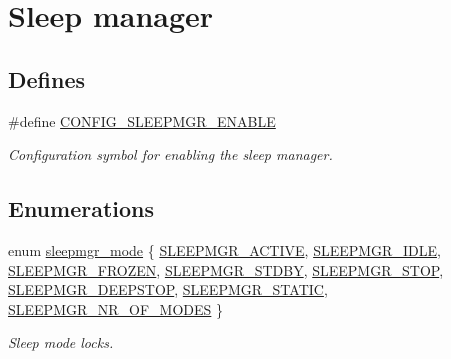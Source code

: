 \hypertarget{group__sleepmgr__group}{
\section{\-Sleep manager}
\label{group__sleepmgr__group}
}
\subsection*{\-Defines}
\begin{DoxyCompactItemize}
\item 
\#define \hyperlink{group__sleepmgr__group_gad8e649a9d53092c580960f2f9886ee98}{\-C\-O\-N\-F\-I\-G\-\_\-\-S\-L\-E\-E\-P\-M\-G\-R\-\_\-\-E\-N\-A\-B\-L\-E}
\begin{DoxyCompactList}\small\item\em \-Configuration symbol for enabling the sleep manager. \end{DoxyCompactList}\end{DoxyCompactItemize}
\subsection*{\-Enumerations}
\begin{DoxyCompactItemize}
\item 
enum \hyperlink{group__sleepmgr__group_gaa990bc3ea16fcad09009cdc70dbc38c6}{sleepmgr\-\_\-mode} \{ \*
\hyperlink{group__sleepmgr__group_ggaa990bc3ea16fcad09009cdc70dbc38c6a04a2ceb6fc138cae84e9334cfa90d89f}{\-S\-L\-E\-E\-P\-M\-G\-R\-\_\-\-A\-C\-T\-I\-V\-E}, 
\hyperlink{group__sleepmgr__group_ggaa990bc3ea16fcad09009cdc70dbc38c6ae4f3742b3532d5ebabef6f26fabf4487}{\-S\-L\-E\-E\-P\-M\-G\-R\-\_\-\-I\-D\-L\-E}, 
\hyperlink{group__sleepmgr__group_ggaa990bc3ea16fcad09009cdc70dbc38c6a07fe232646cccb4c2b9e0ba301866cb9}{\-S\-L\-E\-E\-P\-M\-G\-R\-\_\-\-F\-R\-O\-Z\-E\-N}, 
\hyperlink{group__sleepmgr__group_ggaa990bc3ea16fcad09009cdc70dbc38c6affb1e224bd127ccf5c7b54a54c3ba665}{\-S\-L\-E\-E\-P\-M\-G\-R\-\_\-\-S\-T\-D\-B\-Y}, 
\*
\hyperlink{group__sleepmgr__group_ggaa990bc3ea16fcad09009cdc70dbc38c6a84505afbeafb45b0c9e9b5fc1a1e3e5e}{\-S\-L\-E\-E\-P\-M\-G\-R\-\_\-\-S\-T\-O\-P}, 
\hyperlink{group__sleepmgr__group_ggaa990bc3ea16fcad09009cdc70dbc38c6a6ee894e3a9dc55e678d10a9cebff5dd1}{\-S\-L\-E\-E\-P\-M\-G\-R\-\_\-\-D\-E\-E\-P\-S\-T\-O\-P}, 
\hyperlink{group__sleepmgr__group_ggaa990bc3ea16fcad09009cdc70dbc38c6adbc00d523bb40feb59822bfbec8106c4}{\-S\-L\-E\-E\-P\-M\-G\-R\-\_\-\-S\-T\-A\-T\-I\-C}, 
\hyperlink{group__sleepmgr__group_ggaa990bc3ea16fcad09009cdc70dbc38c6a02fd0aaf6162fa103be2aa0b2593a984}{\-S\-L\-E\-E\-P\-M\-G\-R\-\_\-\-N\-R\-\_\-\-O\-F\-\_\-\-M\-O\-D\-E\-S}
 \}
\begin{DoxyCompactList}\small\item\em \-Sleep mode locks. \end{DoxyCompactList}\end{DoxyCompactItemize}


